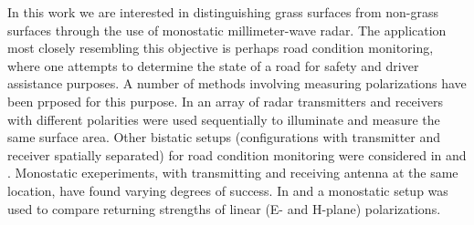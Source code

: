 
In this work we are interested in distinguishing grass surfaces from non-grass surfaces through the use of monostatic millimeter-wave radar. The application most closely resembling this objective is perhaps road condition monitoring, where one attempts to determine the state of a road for safety and driver assistance purposes. A number of methods involving measuring polarizations have been prposed for this purpose. In \citep{finkele_schreck_wanielik_1995} an array of radar transmitters and receivers with different polarities were used sequentially to illuminate and measure the same surface area. Other bistatic setups (configurations with transmitter and receiver spatially separated) for road condition monitoring were considered in \citep{kees_detlefsen_1994} and \citep{finkele_1997}. Monostatic exeperiments, with transmitting and receiving antenna at the same location, have found varying degrees of success. In \citep{viikari_varpula_kantanen_2008} and \citep{häkli_säily_koivisto_huhtinen_dufva_rautiainen_toivanen_nummila_2013} a monostatic setup was used to compare returning strengths of linear (E- and H-plane) polarizations. 


